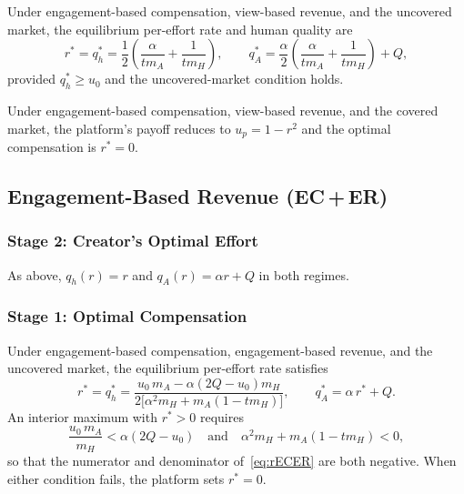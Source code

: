 \documentclass[mnsc,nonblindrev]{informs3_NoOR}
\begin{document}
\begin{proposition}[EC\,+\,VR, Uncovered]\label{prop:ECVR-unc}
Under engagement-based compensation, view-based revenue, and the uncovered market, the equilibrium per-effort rate and human quality are
\begin{equation}\label{eq:rECVR}
r^{*} = q_h^{*} = \frac{1}{2}\!\left(\frac{\alpha}{t m_A} + \frac{1}{t m_H}\right), \qquad
q_A^{*} = \frac{\alpha}{2}\!\left(\frac{\alpha}{t m_A} + \frac{1}{t m_H}\right) + Q,
\end{equation}
provided $q_h^* \geq u_0$ and the uncovered-market condition holds.
\end{proposition}
 
\begin{proposition}[EC\,+\,VR, Covered]\label{prop:ECVR-cov}
Under engagement-based compensation, view-based revenue, and the covered market, the platform's payoff reduces to $u_p = 1 - r^2$ and the optimal compensation is $r^* = 0$.
\end{proposition}
 
 
\subsection{Engagement-Based Revenue (EC\,+\,ER)}
 
\subsubsection{Stage 2: Creator's Optimal Effort}
 
As above, $q_h(r) = r$ and $q_A(r) = \alpha r + Q$ in both regimes.
 
\subsubsection{Stage 1: Optimal Compensation}
 
\begin{proposition}[EC\,+\,ER, Uncovered]\label{prop:ECER-unc}
Under engagement-based compensation, engagement-based revenue, and the uncovered market, the equilibrium per-effort rate satisfies
\begin{equation}\label{eq:rECER}
r^{*} = q_h^{*} = \frac{u_0\, m_A - \alpha(2Q - u_0) m_H} {2\bigl[\alpha^2  m_H +  m_A(1-t m_H)\bigr]}, \qquad
q_A^{*} = \alpha\, r^* + Q.
\end{equation}
An interior maximum with $r^* > 0$ requires
\begin{equation}\label{eq:ECERcond}
\frac{u_0\, m_A}{ m_H} < \alpha(2Q - u_0) \quad \text{and} \quad \alpha^2  m_H +  m_A(1-t m_H) < 0,
\end{equation}
so that the numerator and denominator of~\eqref{eq:rECER} are both negative. When either condition fails, the platform sets $r^* = 0$.
\end{proposition}
 
\end{document}
